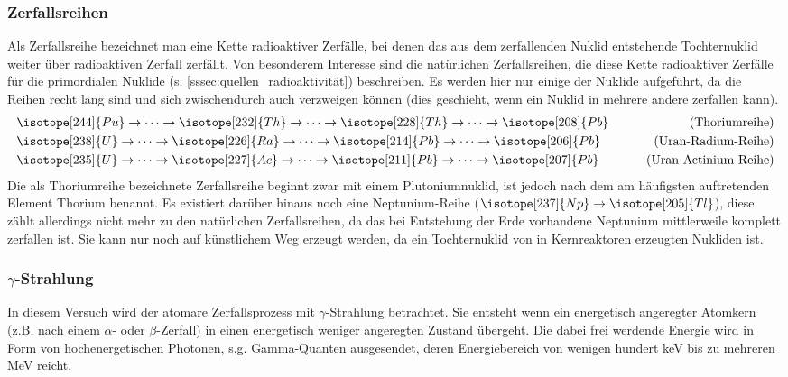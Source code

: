 \documentclass[11pt, a4paper]{article}
\numberwithin{equation}{section}
\begin{document}
\subsubsection{Zerfallsreihen}

Als Zerfallsreihe bezeichnet man eine Kette radioaktiver Zerfälle, bei denen das aus dem zerfallenden Nuklid entstehende Tochternuklid weiter über radioaktiven Zerfall zerfällt.
Von besonderem Interesse sind die natürlichen Zerfallsreihen, die diese Kette radioaktiver Zerfälle für die primordialen Nuklide (s. \ref{sssec:quellen_radioaktivität}) beschreiben.
Es werden hier nur einige der Nuklide aufgeführt, da die Reihen recht lang sind und sich zwischendurch auch verzweigen können (dies geschieht, wenn ein Nuklid in mehrere andere zerfallen kann).
\begin{align*}
	&\isotope[244]{Pu}\to\dots\to\isotope[232]{Th}\to\dots\to\isotope[228]{Th}\to\dots\to\isotope[208]{Pb} &\qquad\text{(Thoriumreihe)}\\
	&\isotope[238]{U}\to\dots\to\isotope[226]{Ra}\to\dots\to\isotope[214]{Pb}\to\dots\to\isotope[206]{Pb} &\qquad\text{(Uran-Radium-Reihe)}\\
	&\isotope[235]{U}\to\dots\to\isotope[227]{Ac}\to\dots\to\isotope[211]{Pb}\to\dots\to\isotope[207]{Pb} &\qquad\text{(Uran-Actinium-Reihe)}
\end{align*}
Die als Thoriumreihe bezeichnete Zerfallsreihe beginnt zwar mit einem Plutoniumnuklid, ist jedoch nach dem am häufigsten auftretenden Element Thorium benannt.
Es existiert darüber hinaus noch eine Neptunium-Reihe ($\isotope[237]{Np}\to\isotope[205]{Tl}$), diese zählt allerdings nicht mehr zu den natürlichen Zerfallsreihen, da das bei Entstehung der Erde vorhandene Neptunium mittlerweile komplett zerfallen ist.
Sie kann nur noch auf künstlichem Weg erzeugt werden, da  ein Tochternuklid von in Kernreaktoren erzeugten Nukliden ist.

\subsubsection{$\gamma$-Strahlung}

In diesem Versuch wird der atomare Zerfallsprozess mit $\gamma$-Strahlung betrachtet.
Sie entsteht wenn ein energetisch angeregter Atomkern (z.B. nach einem $\alpha$- oder $\beta$-Zerfall) in einen energetisch weniger angeregten Zustand übergeht.
Die dabei frei werdende Energie wird in Form von hochenergetischen Photonen, s.g. Gamma-Quanten ausgesendet, deren Energiebereich von wenigen hundert \si{\kilo\electronvolt} bis zu mehreren \si{\mega\electronvolt} reicht.
\end{document}
